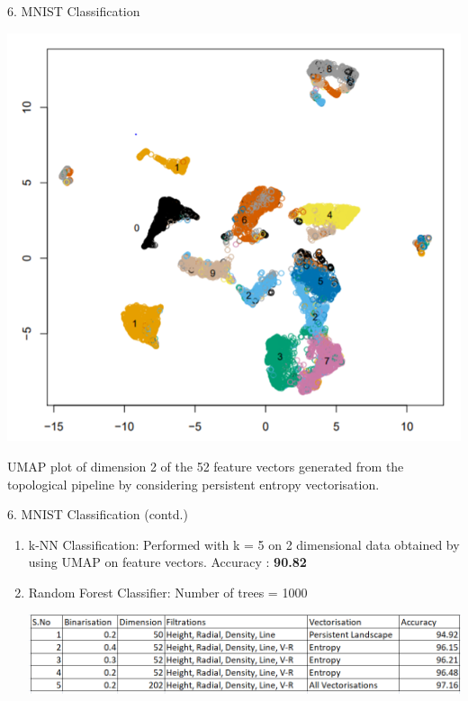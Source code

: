 \documentclass{beamer}
\begin{document}
\begin{frame}{6. MNIST Classification}
\begin{center}
\includegraphics[width=\linewidth,height=0.68\textheight,keepaspectratio]{img3}
\end{center}
UMAP plot of dimension 2 of the 52 feature vectors generated from the topological  pipeline by considering persistent entropy vectorisation.
\end{frame}

\begin{frame}{6. MNIST Classification (contd.)}
\begin{enumerate}
\item k-NN Classification: Performed with k = 5 on 2 dimensional data obtained by using UMAP on feature vectors.\break
Accuracy : \textbf{90.82}

\item{Random Forest Classifier}: Number of trees = 1000
\begin{center}
\includegraphics[width=\linewidth,height=3\textheight,keepaspectratio]{img4}
\end{center}
\end{enumerate}

\end{frame}
\end{document}
